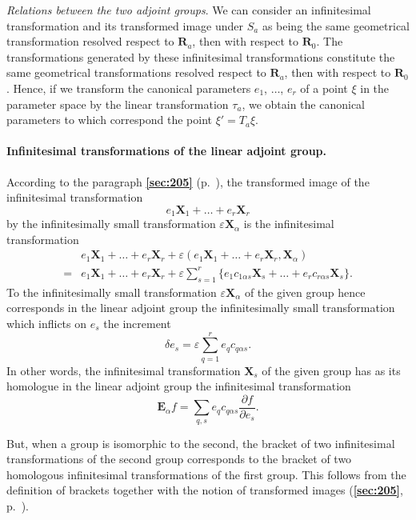 \documentclass[leqno,11pt]{book}
\makeatletter
\numberwithin{equation}{chapter}
\newcommand{\pd}{\partial}
\theoremstyle{shape1}
\theoremstyle{shapesmall}
\let\old@epsilon\epsilon
\let\old@varepsilon\varepsilon
\let\epsilon\old@varepsilon
\let\varepsilon\old@epsilon
\newcommand{\fsref}[1]{{\rm\textsection\textbf{\ref{sec:#1}}}}
\newcommand{\somespace}{\vspace{9pt}}
\makeatother
\begin{document}
\somespace

\emph{Relations between the two adjoint groups}. We can consider an infinitesimal transformation and its transformed image under $S_{a}$ as being the same geometrical transformation resolved respect to $\mathbf{R}_{a}$, then with respect to $\mathbf{R}_{0}$. The transformations generated by these infinitesimal transformations constitute the same geometrical transformations resolved respect to $\mathbf{R}_{a}$, then with respect to $\mathbf{R}_{0}$. Hence, if we transform the canonical parameters $e_{1}$, $\dots$, $e_{r}$ of a point $\xi$ in the parameter space by the linear transformation $\tau_{a}$, we obtain the canonical parameters to which correspond the point $\xi'=T_{a}\xi$.

\paragraph{Infinitesimal transformations of the linear adjoint group.}
\label{sec:217}
According to the paragraph \fsref{205} (p.~\pageref{sec:205}), the transformed image of the infinitesimal transformation
\[
e_{1}\mathbf{X}_{1}+\dots+e_{r}\mathbf{X}_{r}
\]
by the infinitesimally small transformation $\epsilon\mathbf{X}_{\alpha}$ is the infinitesimal transformation
\begin{align*}
  &e_{1}\mathbf{X}_{1}+\dots+e_{r}\mathbf{X}_{r}+\epsilon(e_{1}\mathbf{X}_{1}+\dots+e_{r}\mathbf{X}_{r},\mathbf{X}_{\alpha})\\
  {}={}&e_{1}\mathbf{X}_{1}+\dots+e_{r}\mathbf{X}_{r}+\epsilon\sum_{s=1}^{r}\{e_{1}c_{1\alpha s}\mathbf{X}_{s}+\dots+e_{r}c_{r\alpha s}\mathbf{X}_{s}\}.
\end{align*}
To the infinitesimally small transformation $\epsilon\mathbf{X}_{\alpha}$ of the given group hence corresponds in the linear adjoint group the infinitesimally small transformation which inflicts on $e_{s}$ the increment
\[
\delta e_{s}=\epsilon\sum_{q=1}^{r}e_{q}c_{q\alpha s}.
\]
In other words, the infinitesimal transformation $\mathbf{X}_{s}$ of the given group has as its homologue in the linear adjoint group the infinitesimal transformation
\begin{equation}
  \label{eq:14.21}
  \mathbf{E}_{\alpha}f=\sum_{q,s}e_{q}c_{q\alpha s}\frac{\pd f}{\pd e_{s}}.
\end{equation}

But, when a group is isomorphic to the second, the bracket of two infinitesimal transformations of the second group corresponds to the bracket of two homologous infinitesimal transformations of the first group. This follows from the definition of brackets together with the notion of transformed images (\fsref{205}, p.~\pageref{sec:205}).
\end{document}
